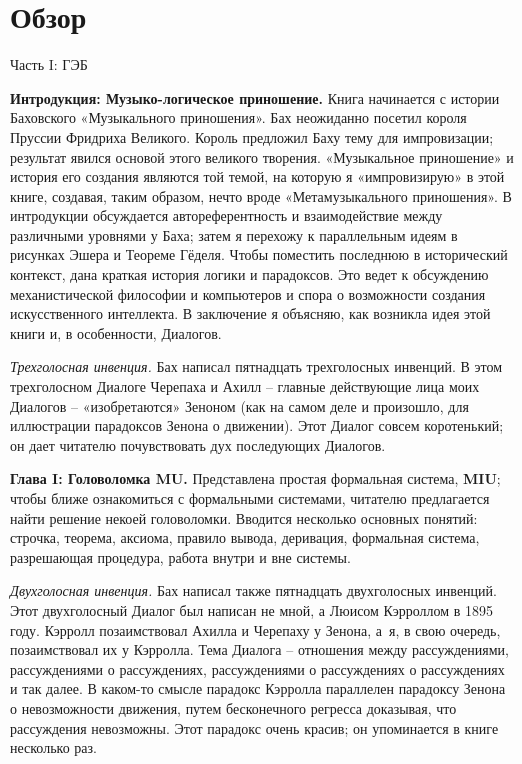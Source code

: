\documentclass[../main.tex]{subfiles}
\begin{document}

\chapter{Обзор}

\begin{center}
    \Large
    Часть I: ГЭБ
\end{center}

\textbf{Интродукция: Музыко-логическое приношение.}
Книга начинается с истории Баховского «Музыкального приношения». Бах неожиданно посетил короля Пруссии Фридриха Великого. Король предложил Баху тему для импровизации; результат явился основой этого великого творения. «Музыкальное приношение» и история его создания являются той темой, на которую я «импровизирую» в этой книге, создавая, таким образом, нечто вроде «Метамузыкального приношения». В интродукции обсуждается автореферентность и взаимодействие между различными уровнями у Баха; затем я перехожу к параллельным идеям в рисунках Эшера и Теореме Гёделя. Чтобы поместить последнюю в исторический контекст, дана краткая история логики и парадоксов. Это ведет к обсуждению механистической философии и компьютеров и спора о возможности создания искусственного интеллекта. В заключение я объясняю, как возникла идея этой книги и, в особенности, Диалогов.

\emph{Трехголосная инвенция.}
Бах написал пятнадцать трехголосных инвенций. В этом трехголосном Диалоге Черепаха и Ахилл \--- главные действующие лица моих Диалогов \--- «изобретаются» Зеноном (как на самом деле и произошло, для иллюстрации парадоксов Зенона о движении). Этот Диалог совсем коротенький; он дает читателю почувствовать дух последующих Диалогов.

\textbf{Глава I: Головоломка MU.}
Представлена простая формальная система, \textbf{MIU}; чтобы ближе ознакомиться с формальными системами, читателю предлагается найти решение некоей головоломки. Вводится несколько основных понятий: строчка, теорема, аксиома, правило вывода, деривация, формальная система, разрешающая процедура, работа внутри и вне системы.

\emph{Двухголосная инвенция.}
Бах написал также пятнадцать двухголосных инвенций. Этот двухголосный Диалог был написан не мной, а Люисом Кэрроллом в 1895 году. Кэрролл позаимствовал Ахилла и Черепаху у Зенона, а~я, в свою очередь, позаимствовал их у Кэрролла. Тема Диалога \--- отношения между рассуждениями, рассуждениями о рассуждениях, рассуждениями о рассуждениях о рассуждениях и так далее. В каком-то смысле парадокс Кэрролла параллелен парадоксу Зенона о невозможности движения, путем бесконечного регресса доказывая, что рассуждения невозможны. Этот парадокс очень красив; он упоминается в книге несколько раз.
\end{document}
